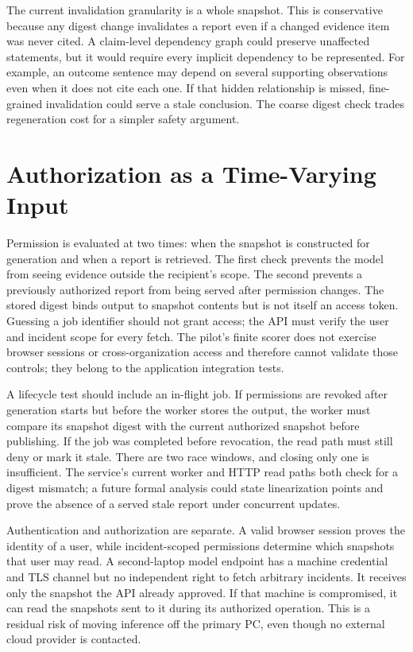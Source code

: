 The current invalidation granularity is a whole snapshot. This is conservative because any digest change invalidates a report even if a changed evidence item was never cited. A claim-level dependency graph could preserve unaffected statements, but it would require every implicit dependency to be represented. For example, an outcome sentence may depend on several supporting observations even when it does not cite each one. If that hidden relationship is missed, fine-grained invalidation could serve a stale conclusion. The coarse digest check trades regeneration cost for a simpler safety argument.

\section{Authorization as a Time-Varying Input}
Permission is evaluated at two times: when the snapshot is constructed for generation and when a report is retrieved. The first check prevents the model from seeing evidence outside the recipient's scope. The second prevents a previously authorized report from being served after permission changes. The stored digest binds output to snapshot contents but is not itself an access token. Guessing a job identifier should not grant access; the API must verify the user and incident scope for every fetch. The pilot's finite scorer does not exercise browser sessions or cross-organization access and therefore cannot validate those controls; they belong to the application integration tests.

A lifecycle test should include an in-flight job. If permissions are revoked after generation starts but before the worker stores the output, the worker must compare its snapshot digest with the current authorized snapshot before publishing. If the job was completed before revocation, the read path must still deny or mark it stale. There are two race windows, and closing only one is insufficient. The service's current worker and HTTP read paths both check for a digest mismatch; a future formal analysis could state linearization points and prove the absence of a served stale report under concurrent updates.

Authentication and authorization are separate. A valid browser session proves the identity of a user, while incident-scoped permissions determine which snapshots that user may read. A second-laptop model endpoint has a machine credential and TLS channel but no independent right to fetch arbitrary incidents. It receives only the snapshot the API already approved. If that machine is compromised, it can read the snapshots sent to it during its authorized operation. This is a residual risk of moving inference off the primary PC, even though no external cloud provider is contacted.

